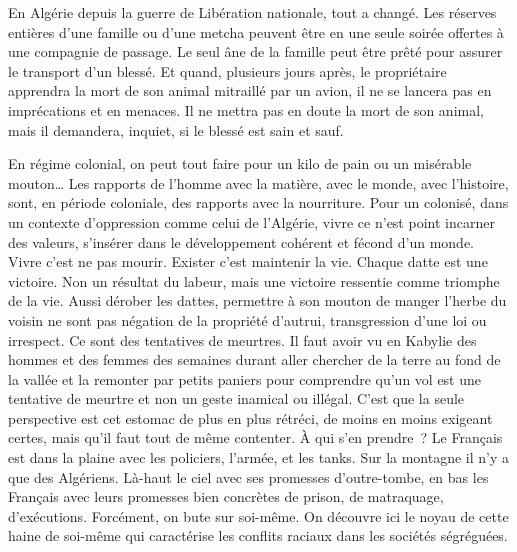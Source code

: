 \documentclass[french,twoside]{book} %
\begin{document}
En Algérie depuis la guerre de Libération nationale, tout a changé. Les réserves entières d’une famille ou d’une metcha peuvent être en une seule soirée offertes à une compagnie de passage. Le seul âne de la famille peut être prêté pour assurer le transport d’un blessé. Et quand, plusieurs jours après, le propriétaire apprendra la mort de son animal mitraillé par un avion, il ne se lancera pas en imprécations et en menaces. Il ne mettra pas en doute la mort de son animal, mais il demandera, inquiet, si le blessé est sain et sauf.\par
En régime colonial, on peut tout faire pour un kilo de pain ou un misérable mouton… Les rapports de l’homme avec la matière, avec le monde, avec l’histoire, sont, en période coloniale, des rapports avec la nourriture. Pour un colonisé, dans un contexte d’oppression comme celui de l’Algérie, vivre ce n’est point incarner des valeurs, s’insérer dans le développement cohérent et fécond d’un monde. Vivre c’est ne pas mourir. Exister c’est maintenir la vie. Chaque datte est une victoire. Non un résultat du labeur, mais une victoire ressentie comme triomphe de la vie. Aussi dérober les dattes, permettre à son mouton de manger l’herbe du voisin ne sont pas négation de la propriété d’autrui, transgression d’une loi ou irrespect. Ce sont des tentatives de meurtres. Il faut avoir vu en Kabylie des hommes et des femmes des semaines durant aller chercher de la terre au fond de la vallée et la remonter par petits paniers pour comprendre qu’un vol est une tentative de meurtre et non un geste inamical ou illégal. C’est que la seule perspective est cet estomac de plus en plus rétréci, de moins en moins exigeant certes, mais qu’il faut tout de même contenter. À qui s’en prendre ? Le Français est dans la plaine avec les policiers, l’armée, et les tanks. Sur la montagne il n’y a que des Algériens. Là-haut le ciel avec ses promesses d’outre-tombe, en bas les Français avec leurs promesses bien concrètes de prison, de   matraquage, d’exécutions. Forcément, on bute sur soi-même. On découvre ici le noyau de cette haine de soi-même qui caractérise les conflits raciaux dans les sociétés ségréguées.\par
\end{document}
